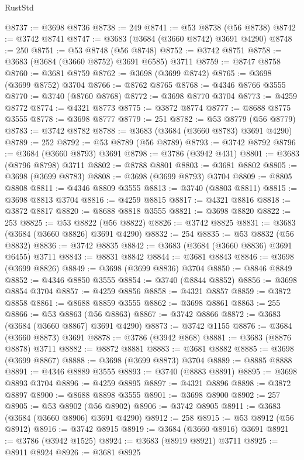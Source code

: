 \begin{lexlean}{RustStd}
\begin{coremodule}
{\begin{coremodule}
{{{{{{{{{{{{{{{{{{{{{{{{{{{{{{{{{{{{{{{{{{{{{{{@8737 := @3698 @8736
@8738 := 249
@8741 := @53 @8738 (@56 @8738)
@8742 := @3742 @8741
@8747 := @3683 (@3684 (@3660 @8742) @3691 @4290)
@8748 := 250
@8751 := @53 @8748 (@56 @8748)
@8752 := @3742 @8751
@8758 := @3683 (@3684 (@3660 @8752) @3691 @6585) @3711
@8759 := @8747 @8758
@8760 := @3681 @8759
@8762 := @3698 (@3699 @8742)
@8765 := @3698 (@3699 @8752) @3704
@8766 := @8762 @8765
@8768 := @4346 @8766 @3555
@8770 := @3740 (@8760 @8768)
@8772 := @3698 @8770 @3704
@8773 := @4259 @8772
@8774 := @4321 @8773
@8775 := @3872 @8774
@8777 := @8688 @8775 @3555
@8778 := @3698 @8777
@8779 := 251
@8782 := @53 @8779 (@56 @8779)
@8783 := @3742 @8782
@8788 := @3683 (@3684 (@3660 @8783) @3691 @4290)
@8789 := 252
@8792 := @53 @8789 (@56 @8789)
@8793 := @3742 @8792
@8796 := @3684 (@3660 @8793) @3691
@8798 := @3786 (@3942 @431)
@8801 := @3683 (@8796 @8798) @3711
@8802 := @8788 @8801
@8803 := @3681 @8802
@8805 := @3698 (@3699 @8783)
@8808 := @3698 (@3699 @8793) @3704
@8809 := @8805 @8808
@8811 := @4346 @8809 @3555
@8813 := @3740 (@8803 @8811)
@8815 := @3698 @8813 @3704
@8816 := @4259 @8815
@8817 := @4321 @8816
@8818 := @3872 @8817
@8820 := @8688 @8818 @3555
@8821 := @3698 @8820
@8822 := 253
@8825 := @53 @8822 (@56 @8822)
@8826 := @3742 @8825
@8831 := @3683 (@3684 (@3660 @8826) @3691 @4290)
@8832 := 254
@8835 := @53 @8832 (@56 @8832)
@8836 := @3742 @8835
@8842 := @3683 (@3684 (@3660 @8836) @3691 @6455) @3711
@8843 := @8831 @8842
@8844 := @3681 @8843
@8846 := @3698 (@3699 @8826)
@8849 := @3698 (@3699 @8836) @3704
@8850 := @8846 @8849
@8852 := @4346 @8850 @3555
@8854 := @3740 (@8844 @8852)
@8856 := @3698 @8854 @3704
@8857 := @4259 @8856
@8858 := @4321 @8857
@8859 := @3872 @8858
@8861 := @8688 @8859 @3555
@8862 := @3698 @8861
@8863 := 255
@8866 := @53 @8863 (@56 @8863)
@8867 := @3742 @8866
@8872 := @3683 (@3684 (@3660 @8867) @3691 @4290)
@8873 := @3742 @1155
@8876 := @3684 (@3660 @8873) @3691
@8878 := @3786 (@3942 @868)
@8881 := @3683 (@8876 @8878) @3711
@8882 := @8872 @8881
@8883 := @3681 @8882
@8885 := @3698 (@3699 @8867)
@8888 := @3698 (@3699 @8873) @3704
@8889 := @8885 @8888
@8891 := @4346 @8889 @3555
@8893 := @3740 (@8883 @8891)
@8895 := @3698 @8893 @3704
@8896 := @4259 @8895
@8897 := @4321 @8896
@8898 := @3872 @8897
@8900 := @8688 @8898 @3555
@8901 := @3698 @8900
@8902 := 257
@8905 := @53 @8902 (@56 @8902)
@8906 := @3742 @8905
@8911 := @3683 (@3684 (@3660 @8906) @3691 @4290)
@8912 := 258
@8915 := @53 @8912 (@56 @8912)
@8916 := @3742 @8915
@8919 := @3684 (@3660 @8916) @3691
@8921 := @3786 (@3942 @1525)
@8924 := @3683 (@8919 @8921) @3711
@8925 := @8911 @8924
@8926 := @3681 @8925
}}}}}}}}}}}}}}}}}}}}}}}}}}}}}}}}}}}}}}}}}}}}}}}
\end{coremodule}}
\end{coremodule}
\end{lexlean}

